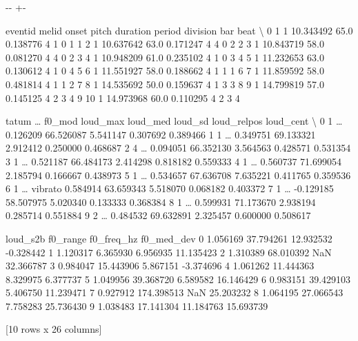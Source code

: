 \documentclass[letterpaper,10pt,english]{sphinxmanual}
\newlength\nbsphinxcodecellspacing
\begin{document}
{

\kern-\sphinxverbatimsmallskipamount\kern-\baselineskip
\kern+\FrameHeightAdjust\kern-\fboxrule
\vspace{\nbsphinxcodecellspacing}

\begin{sphinxVerbatim}[commandchars=\\\{\}]
\llap{\color{nbsphinxout}[9]:\,\hspace{\fboxrule}\hspace{\fboxsep}}   eventid  melid      onset  pitch  duration  period  division  bar  beat  \textbackslash{}
0        1      1  10.343492   65.0  0.138776       4         1    0     1
1        2      1  10.637642   63.0  0.171247       4         4    0     2
2        3      1  10.843719   58.0  0.081270       4         4    0     2
3        4      1  10.948209   61.0  0.235102       4         1    0     3
4        5      1  11.232653   63.0  0.130612       4         1    0     4
5        6      1  11.551927   58.0  0.188662       4         1    1     1
6        7      1  11.859592   58.0  0.481814       4         1    1     2
7        8      1  14.535692   50.0  0.159637       4         1    3     3
8        9      1  14.799819   57.0  0.145125       4         2    3     4
9       10      1  14.973968   60.0  0.110295       4         2    3     4

   tatum  {\ldots}   f0\_mod  loud\_max   loud\_med   loud\_sd  loud\_relpos loud\_cent  \textbackslash{}
0      1  {\ldots}           0.126209  66.526087  5.541147     0.307692  0.389466
1      1  {\ldots}           0.349751  69.133321  2.912412     0.250000  0.468687
2      4  {\ldots}           0.094051  66.352130  3.564563     0.428571  0.531354
3      1  {\ldots}           0.521187  66.484173  2.414298     0.818182  0.559333
4      1  {\ldots}           0.560737  71.699054  2.185794     0.166667  0.438973
5      1  {\ldots}           0.534657  67.636708  7.635221     0.411765  0.359536
6      1  {\ldots}  vibrato  0.584914  63.659343  5.518070     0.068182  0.403372
7      1  {\ldots}          -0.129185  58.507975  5.020340     0.133333  0.368384
8      1  {\ldots}           0.599931  71.173670  2.938194     0.285714  0.551884
9      2  {\ldots}           0.484532  69.632891  2.325457     0.600000  0.508617

   loud\_s2b    f0\_range  f0\_freq\_hz  f0\_med\_dev
0  1.056169   37.794261   12.932532   -0.328442
1  1.120317    6.365930    6.956935   11.135423
2  1.310389   68.010392         NaN   32.366787
3  0.984047   15.443906    5.867151   -3.374696
4  1.061262   11.444363    8.329975    6.377737
5  1.049956   39.368720    6.589582   16.146429
6  0.983151   39.429103    5.406750   11.239471
7  0.927912  174.398513         NaN   25.203232
8  1.064195   27.066543    7.758283   25.736430
9  1.038483   17.141304   11.184763   15.693739

[10 rows x 26 columns]
\end{sphinxVerbatim}
}
\end{document}

